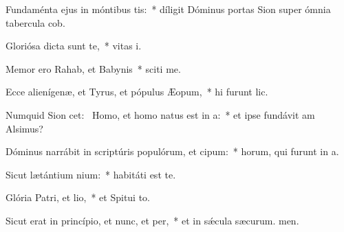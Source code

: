 \item Fundaménta ejus in móntibus tis:~* díligit Dóminus portas Sion super ómnia tabercula cob.
\item Gloriósa dicta sunt  te,~* vitas i.
\item Memor ero Rahab, et Babynis~* sciti me.
\item Ecce alienígenæ, et Tyrus, et pópulus Æopum,~* hi furunt lic.
\item Numquid Sion cet:~\pscross{} Homo, et homo natus est in a:~* et ipse fundávit am Alsimus?
\item Dóminus narrábit in scriptúris populórum, et cipum:~* horum, qui furunt in a.
\item Sicut lætántium nium:~* habitáti est  te.
\item Glória Patri, et lio,~* et Spitui to.
\item Sicut erat in princípio, et nunc, et per,~* et in sǽcula sæcurum. men.
